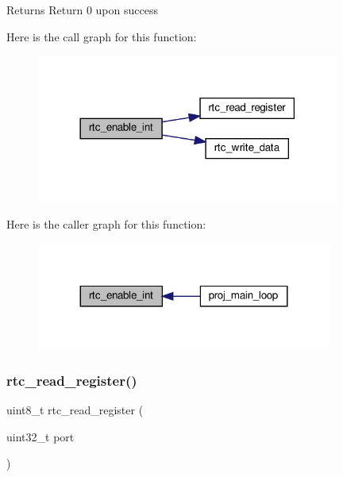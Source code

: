 \begin{DoxyReturn}{Returns}
Return 0 upon success 
\end{DoxyReturn}
Here is the call graph for this function\+:
\nopagebreak
\begin{figure}[H]
\begin{center}
\leavevmode
\includegraphics[width=282pt]{group__rtc_ga8d098a183fdb5fc38da0335041c4d3db_cgraph}
\end{center}
\end{figure}
Here is the caller graph for this function\+:\nopagebreak
\begin{figure}[H]
\begin{center}
\leavevmode
\includegraphics[width=275pt]{group__rtc_ga8d098a183fdb5fc38da0335041c4d3db_icgraph}
\end{center}
\end{figure}
\mbox{\label{group__rtc_ga72153103ac037b1a162a9099f001b83c}} 
\subsubsection{\texorpdfstring{rtc\+\_\+read\+\_\+register()}{rtc\_read\_register()}}
{\footnotesize\ttfamily uint8\+\_\+t rtc\+\_\+read\+\_\+register (\begin{DoxyParamCaption}\item[{uint32\+\_\+t}]{port }\end{DoxyParamCaption})}



